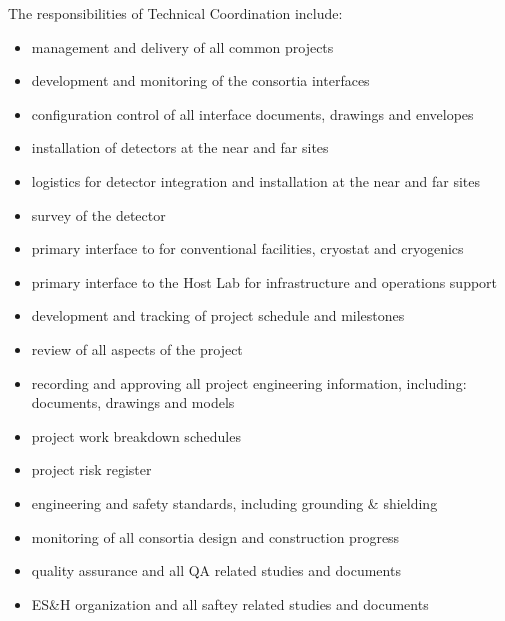 The responsibilities of Technical Coordination include:
\begin{itemize}
  \item management and delivery of all common projects
  \item development and monitoring of the consortia interfaces
  \item configuration control of all interface documents, drawings and envelopes
  \item installation of detectors at the near and far sites
  \item logistics for detector integration and installation at the near and far sites
  \item survey of the detector
  \item primary interface to  for conventional facilities, cryostat and cryogenics
  \item primary interface to the Host Lab for infrastructure and operations support
  \item development and tracking of project schedule and milestones
  \item review of all aspects of the project
  \item recording and approving all project engineering information, including: documents, drawings and models
  \item project work breakdown schedules
  \item project risk register
  \item {} engineering and safety standards, including grounding \& shielding
  \item monitoring of all consortia design and construction progress
  \item quality assurance and all QA related studies and documents
  \item ES\&H organization and all saftey related studies and documents
\end {itemize}

